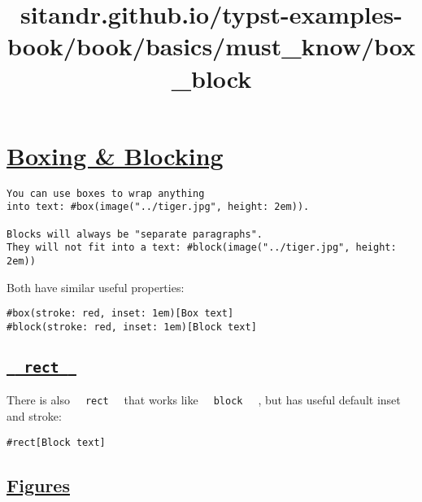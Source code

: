 \title{sitandr.github.io/typst-examples-book/book/basics/must_know/box_block}

\section{\texorpdfstring{\hyperref[boxing--blocking]{Boxing \&
Blocking}}{Boxing \& Blocking}}\label{boxing--blocking}

\begin{verbatim}
You can use boxes to wrap anything
into text: #box(image("../tiger.jpg", height: 2em)).

Blocks will always be "separate paragraphs".
They will not fit into a text: #block(image("../tiger.jpg", height: 2em))
\end{verbatim}

\pandocbounded{}

Both have similar useful properties:

\begin{verbatim}
#box(stroke: red, inset: 1em)[Box text]
#block(stroke: red, inset: 1em)[Block text]
\end{verbatim}

\pandocbounded{}

\subsection{\texorpdfstring{\hyperref[rect]{\texttt{\ }{\texttt{\ rect\ }}\texttt{\ }}}{  rect  }}\label{rect}

There is also \texttt{\ }{\texttt{\ rect\ }}\texttt{\ } that works like
\texttt{\ }{\texttt{\ block\ }}\texttt{\ } , but has useful default
inset and stroke:

\begin{verbatim}
#rect[Block text]
\end{verbatim}

\pandocbounded{}

\subsection{\texorpdfstring{\hyperref[figures]{Figures}}{Figures}}\label{figures}

